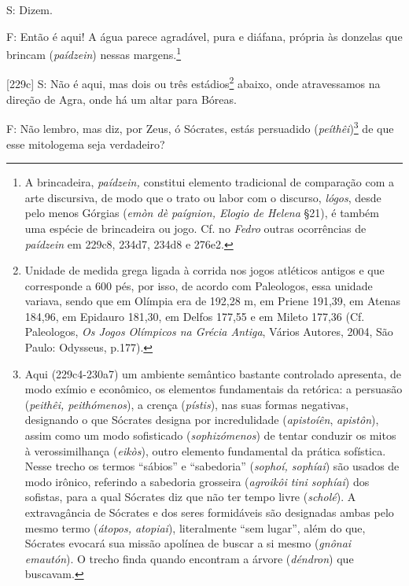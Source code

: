 S: Dizem.

F: Então é aqui! A água parece agradável, pura e diáfana, própria às
donzelas que brincam (\emph{paídzein}) nessas margens.\footnote{A
  brincadeira, \emph{paídzein,} constitui elemento tradicional de
  comparação com a arte discursiva, de modo que o trato ou labor com o
  discurso, \emph{lógos}, desde pelo menos Górgias (\emph{emòn dè
  paígnion, Elogio de Helena} §21), é também uma espécie de brincadeira
  ou jogo. Cf. no \emph{Fedro} outras ocorrências de \emph{paídzein} em
  229c8, 234d7, 234d8 e 276e2.}

{[}229c{]} S: Não é aqui, mas dois ou três estádios\footnote{Unidade de
  medida grega ligada à corrida nos jogos atléticos antigos e que
  corresponde a 600 pés, por isso, de acordo com Paleologos, essa
  unidade variava, sendo que em Olímpia era de 192,28 m, em Priene
  191,39, em Atenas 184,96, em Epidauro 181,30, em Delfos 177,55 e em
  Mileto 177,36 (Cf. Paleologos, \emph{Os Jogos Olímpicos na Grécia
  Antiga}, Vários Autores, 2004, São Paulo: Odysseus, p.177).} abaixo,
onde atravessamos na direção de Agra, onde há um altar para Bóreas.

F: Não lembro, mas diz, por Zeus, ó Sócrates, estás persuadido
(\emph{peíthêi})\footnote{Aqui (229c4-230a7) um ambiente semântico
  bastante controlado apresenta, de modo exímio e econômico, os
  elementos fundamentais da retórica: a persuasão (\emph{peithêi,
  peithómenos}), a crença (\emph{pístis}), nas suas formas negativas,
  designando o que Sócrates designa por incredulidade (\emph{apistoíên},
  \emph{apistôn}), assim como um modo sofisticado (\emph{sophizómenos})
  de tentar conduzir os mitos à verossimilhança (\emph{eikòs}), outro
  elemento fundamental da prática sofística. Nesse trecho os termos
  ``sábios'' e ``sabedoria'' (\emph{sophoí, sophíai}) são usados de modo
  irônico, referindo a sabedoria grosseira (\emph{agroikôi tini
  sophíai}) dos sofistas, para a qual Sócrates diz que não ter tempo
  livre (\emph{scholé}). A extravagância de Sócrates e dos seres
  formidáveis são designadas ambas pelo mesmo termo (\emph{átopos,
  atopiai}), literalmente ``sem lugar'', além do que, Sócrates evocará
  sua missão apolínea de buscar a si mesmo (\emph{gnônai}
  \emph{emautón}). O trecho finda quando encontram a árvore
  (\emph{déndron}) que buscavam.} de que esse mitologema seja
verdadeiro?

